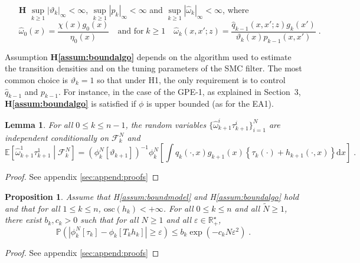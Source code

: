 \documentclass[12pt]{article}
\newcommand{\rmd}{\mathrm{d}}
\newcommand{\eqsp}{\;}
\newcommand{\1}{\mathrm{1}}
\newtheorem{lemma}{Lemma}
\newtheorem{proposition}{Proposition}
\newcounter{hypA}
\newenvironment{hypA}{\refstepcounter{hypA}\begin{itemize}
\item[{\bf H\arabic{hypA}}]}{\end{itemize}}
\begin{document}
\begin{hypA}
\label{assum:boundalgo}
$\underset{k\geq 1}{\sup}|\vartheta_k|_{\infty} < \infty$, $\underset{k\geq 1}{\sup}|p_k|_{\infty} < \infty$ and $\underset{k\geq 1}{\sup}|\widehat{\omega}_{k}|_{\infty} < \infty$, where
\[
\widehat{\omega}_{0}(x) = \frac{\chi(x)g_0(x)}{\eta_0(x)} \quad\mbox{and for}\; k\ge1\quad\widehat{\omega}_{k}(x,x';z) = \frac{\widehat{q}_{k-1}(x,x';z)g_{k}(x')}{\vartheta_{k}(x) p_{k-1} (x,x')}\eqsp.
\]
\end{hypA}
Assumption {\bf H\ref{assum:boundalgo}} depends on the algorithm used to estimate the transition densities and on the tuning parameters of the  SMC filter. 
The most common choice is $\vartheta_k = 1$ so that under H1, the only requirement is to control $\widehat{q}_{k-1}$ and $p_{k-1}$. 
For instance, in the case of the GPE-1, as explained in Section~3, {\bf H\ref{assum:boundalgo}} is satisfied if $\phi$ is upper bounded (as for the EA1).

\begin{lemma}
\label{lem:iid}
For all $0\le k \le n-1$, the random variables $\{\widehat{\omega}_{k+1}^i\tau_{k+1}^i\}_{i=1}^N$ are independent conditionally on $\mathcal{F}_k^{N}$ and
\[
\mathbb{E}\left[\widehat{\omega}^1_{k+1}\tau^{1}_{k+1}\middle| \mathcal{F}_k^{N}\right] = \left(\phi^N_{k}[\vartheta_{k+1}]\right)^{-1}\phi^N_{k}\left[\int q_{k}(\cdot,x)g_{k+1}(x)\left\{\tau_k(\cdot) + h_{k+1}(\cdot,x)\right\}\rmd x\right]\eqsp.
\]
\end{lemma}

\begin{proof}
See appendix \ref{sec:append:proofs}
\end{proof}

\begin{proposition}
\label{prop:exp:deviation}
Assume that H\ref{assum:boundmodel} and H\ref{assum:boundalgo} hold and that for all $1\le k\le n$, $\mathrm{osc}(h_k)<+\infty$. 
For all $0\le k\le n$ and all $\widetilde{N}\ge 1$, there exist $b_k,c_k>0$ such that for all $N\ge 1$ and all $\varepsilon\in\mathbb{R}_+^\star$,
\[
\mathbb{P}\left(\left|\phi_k^N[\tau_k] - \phi_k\left[T_kh_k\right]\right|\ge \varepsilon\right)\le b_k\exp\left(-c_kN\varepsilon^2\right)\eqsp.
\]
\end{proposition}

\begin{proof}
See appendix \ref{sec:append:proofs}
\end{proof}
\end{document}

